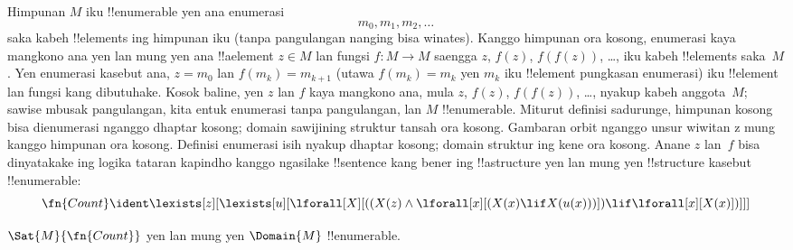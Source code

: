 \documentclass[../../../include/open-logic-section]{subfiles}
\begin{document}
Himpunan $M$ iku !!{enumerable} yen ana enumerasi
\[
m_0, m_1, m_2, \dots
\]
saka kabeh !!{element}s ing himpunan iku (tanpa pangulangan nanging bisa
winates). Kanggo himpunan ora kosong, enumerasi kaya mangkono
ana yen lan mung yen ana !!a{element} $z \in M$ lan fungsi
$f\colon M \to M$ saengga $z$, $f(z)$, $f(f(z))$, \dots,
iku kabeh !!{element}s saka~$M$. Yen enumerasi kasebut ana,
$z = m_0$ lan $f(m_k) = m_{k+1}$ (utawa $f(m_k) = m_k$
yen $m_k$ iku !!{element} pungkasan enumerasi) iku
!!{element} lan fungsi kang dibutuhake. Kosok baline, yen
$z$ lan $f$ kaya mangkono ana, mula $z$, $f(z)$,
$f(f(z))$, \dots, nyakup kabeh anggota~$M$; sawise mbusak pangulangan, kita entuk enumerasi tanpa pangulangan, lan $M$
!!{enumerable}. Miturut definisi sadurunge, himpunan kosong
bisa dienumerasi nganggo dhaptar kosong; domain sawijining
struktur tansah ora kosong. Gambaran orbit nganggo unsur wiwitan z mung kanggo himpunan ora kosong. Definisi enumerasi isih nyakup dhaptar kosong; domain struktur ing kene ora kosong. Anane $z$ lan~$f$ bisa
dinyatakake ing logika tataran kapindho kanggo ngasilake
!!{sentence} kang bener ing !!a{structure} yen lan mung
yen !!{structure} kasebut !!{enumerable}:
\[
\fn{Count} \ident
\lexists[z][\lexists[u][\lforall[X][((X(z) \land
      \lforall[x][(X(x) \lif X(u(x)))]) \lif \lforall[x][X(x)])]]]
\]

\begin{prop}
$\Sat{M}{\fn{Count}}$ yen lan mung yen $\Domain{M}$
!!{enumerable}.
\end{prop}
\end{document}
